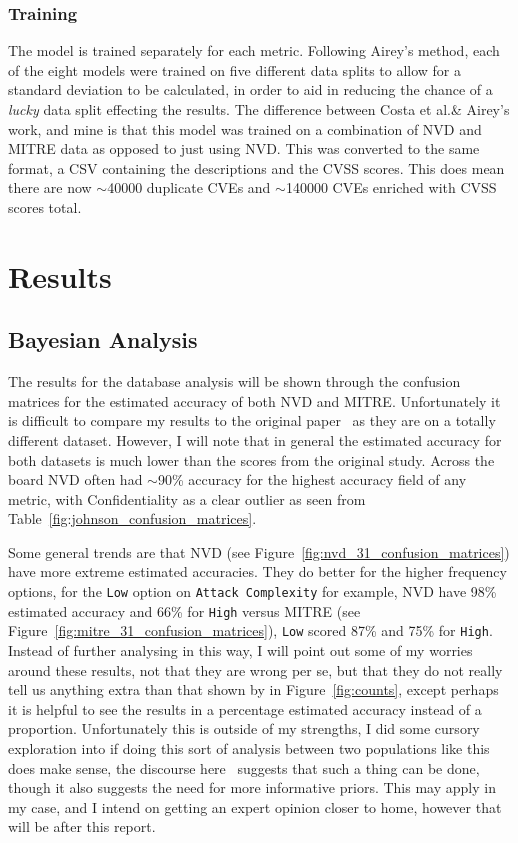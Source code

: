 \documentclass[12pt]{article}
\begin{document}
\subsubsection{Training}

The model is trained separately for each metric. Following Airey's method, each of the eight models
were trained on five different data splits to allow for a standard deviation to be calculated, in
order to aid in reducing the chance of a \textit{lucky} data split effecting the results. The
difference between Costa et al.\@ \& Airey's work, and mine is that this model was trained on a
combination of NVD and MITRE data as opposed to just using NVD. This was converted to the same
format, a CSV containing the descriptions and the CVSS scores. This does mean there are now
$\sim$40000 duplicate CVEs and $\sim$140000 CVEs enriched with CVSS scores total.

\section{Results}

\subsection{Bayesian Analysis}

The results for the database analysis will be shown through the confusion matrices for the estimated
accuracy of both NVD and MITRE. Unfortunately it is difficult to compare my results to the original
paper~\cite{bayes} as they are on a totally different dataset. However, I will note that in general the estimated
accuracy for both datasets is much lower than the scores from the original study. Across the board NVD
often had $\sim$90\% accuracy for the highest accuracy field of any metric, with Confidentiality as
a clear outlier as seen from Table~\ref{fig:johnson_confusion_matrices}.

Some general trends are that NVD (see Figure~\ref{fig:nvd_31_confusion_matrices}) have more extreme
estimated accuracies. They do better for the higher frequency options, for the \texttt{Low} option
on \texttt{Attack Complexity} for example, NVD have 98\% estimated accuracy and 66\% for
\texttt{High} versus MITRE (see Figure~\ref{fig:mitre_31_confusion_matrices}), \texttt{Low} scored
87\% and 75\% for \texttt{High}. Instead of further analysing in this way, I will point out some of
my worries around these results, not that they are wrong per se, but that they do not really tell us
anything extra than that shown by in Figure~\ref{fig:counts}, except perhaps it is helpful to see
the results in a percentage estimated accuracy instead of a proportion. Unfortunately this is
outside of my strengths, I did some cursory exploration into if doing this sort of analysis
between two populations like this does make sense, the discourse here~\cite{stat_modeling} suggests
that such a thing can be done, though it also suggests the need for more informative priors. This
may apply in my case, and I intend on getting an expert opinion closer to home, however that will be
after this report.
\end{document}
